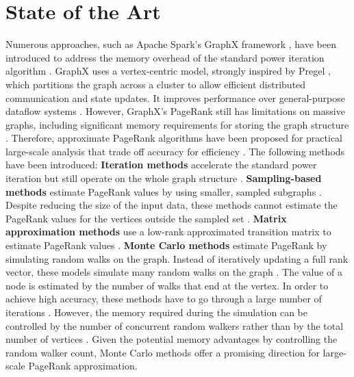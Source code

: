 \documentclass[a4paper,12pt]{article}
\begin{document}
\section{State of the Art}
Numerous approaches, such as Apache Spark's GraphX framework \cite{xin_graphx_2013}, have been introduced to address the memory overhead of the standard power iteration algorithm \cite{page_pagerank_1999}.
GraphX uses a vertex-centric model, strongly inspired by Pregel \cite{malewicz_pregel_2010}, which partitions the graph across a cluster to allow efficient distributed communication and state updates. It improves performance over general-purpose dataflow systems \cite{jin_software_2022}. However, GraphX's PageRank still has limitations on massive graphs, including significant memory requirements for storing the graph structure \cite{wu_efficient_2024}\cite{xin_graphx_2014}. Therefore, approximate PageRank algorithms have been proposed for practical large-scale analysis that trade off accuracy for efficiency \cite{wu_efficient_2024}. The following methods have been introduced:
\textbf{Iteration methods} \cite{xie_parameterized_2023-1}\cite{anikin_efficient_2022} accelerate the standard power iteration but still operate on the whole graph structure \cite{wu_efficient_2024}. 
\textbf{Sampling-based methods} estimate PageRank values by using smaller, sampled subgraphs \cite{bar-yossef_local_2008}\cite{chen_local_2004}. Despite reducing the size of the input data, these methods cannot estimate the PageRank values for the vertices outside the sampled set \cite{wu_efficient_2024}.
\textbf{Matrix approximation methods} use a low-rank approximated transition matrix to estimate PageRank values \cite{liu_fast_2015}\cite{benczur_feasibility_2005}. 
\textbf{Monte Carlo methods} estimate PageRank by simulating random walks on the graph. Instead of iteratively updating a full rank vector, these models simulate many random walks on the graph \cite{avrachenkov_monte_2007}. The value of a node is estimated by the number of walks that end at the vertex. In order to achieve high accuracy, these methods have to go through a large number of iterations \cite{wu_efficient_2024}. However, the memory required during the simulation can be controlled by the number of concurrent random walkers rather than by the total number of vertices \cite{avrachenkov_monte_2007}. Given the potential memory advantages by controlling the random walker count, Monte Carlo methods offer a promising direction for large-scale PageRank approximation.
 
\end{document}

